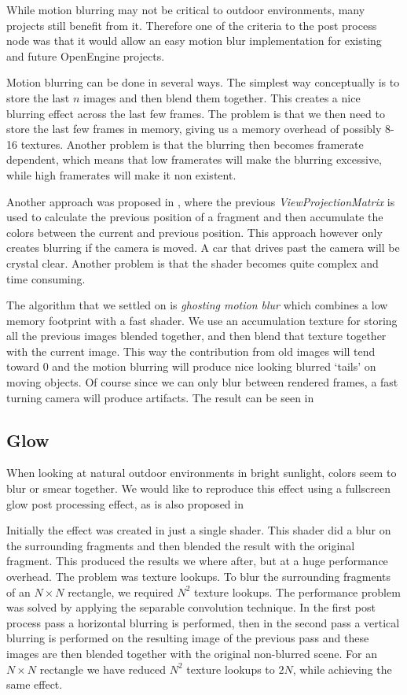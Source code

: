 While motion blurring may not be critical to outdoor environments,
many projects still benefit from it. Therefore one of the criteria
to the post process node was that it would allow an easy motion blur
implementation for existing and future OpenEngine projects.

Motion blurring can be done in several ways. The simplest way
conceptually is to store the last $n$ images and then blend them
together. This creates a nice blurring effect across the last few
frames. The problem is that we then need to store the last few frames
in memory, giving us a memory overhead of possibly 8-16
textures. Another problem is that the blurring then becomes framerate
dependent, which means that low framerates will make the blurring
excessive, while high framerates will make it non existent.

Another approach was proposed in , where
the previous \emph{ViewProjectionMatrix} is used to calculate the
previous position of a fragment and then accumulate the colors between
the current and previous position. This approach however only creates
blurring if the camera is moved. A car that drives past the camera
will be crystal clear. Another problem is that the shader becomes
quite complex and time consuming.

The algorithm that we settled on is \emph{ghosting motion blur} which
combines a low memory footprint with a fast shader. We use an
accumulation texture for storing all the previous images blended
together, and then blend that texture together with the current
image. This way the contribution from old images will tend toward 0
and the motion blurring will produce nice looking blurred `tails' on
moving objects. Of course since we can only blur between rendered
frames, a fast turning camera will produce artifacts. The result can
be seen in 

\subsection{Glow}

When looking at natural outdoor environments in bright sunlight,
colors seem to blur or smear together. We would like to reproduce this
effect using a fullscreen glow post processing effect, as is also
proposed in 

Initially the effect was created in just a single shader. This shader
did a blur on the surrounding fragments and then blended the result
with the original fragment. This produced the results we where after,
but at a huge performance overhead. The problem was texture
lookups. To blur the surrounding fragments of an $N \times N$
rectangle, we required $N^2$ texture lookups. The performance problem
was solved by applying the separable convolution technique. In the
first post process pass a horizontal blurring is performed, then in
the second pass a vertical blurring is performed on the resulting
image of the previous pass and these images are then blended together
with the original non-blurred scene. For an $N \times N$ rectangle we
have reduced $N^2$ texture lookups to $2N$, while achieving the same
effect.

